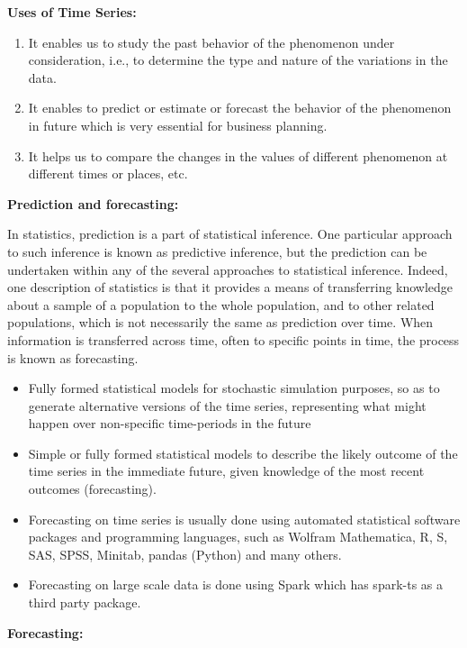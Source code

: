 \documentclass[12pt,openany]{book}
\providecommand{\tightlist}{%
  \setlength{\itemsep}{0pt}\setlength{\parskip}{0pt}}
\begin{document}
\textbf{Uses of Time Series:}

\begin{enumerate}
\def\labelenumi{\arabic{enumi}.}
\tightlist
\item
  It enables us to study the past behavior of the phenomenon under consideration, i.e., to determine the type and nature of the variations in the data.
\item
  It enables to predict or estimate or forecast the behavior of the phenomenon in future which is very essential for business planning.
\item
  It helps us to compare the changes in the values of different phenomenon at different times or places, etc.
\end{enumerate}

\textbf{Prediction and forecasting:}

In statistics, prediction is a part of statistical inference. One particular approach to such inference is known as predictive inference, but the prediction can be undertaken within any of the several approaches to statistical inference. Indeed, one description of statistics is that it provides a means of transferring knowledge about a sample of a population to the whole population, and to other related populations, which is not necessarily the same as prediction over time. When information is transferred across time, often to specific points in time, the process is known as forecasting.

\begin{itemize}
\tightlist
\item
  Fully formed statistical models for stochastic simulation purposes, so as to generate alternative versions of the time series, representing what might happen over non-specific time-periods in the future
\item
  Simple or fully formed statistical models to describe the likely outcome of the time series in the immediate future, given knowledge of the most recent outcomes (forecasting).
\item
  Forecasting on time series is usually done using automated statistical software packages and programming languages, such as Wolfram Mathematica, R, S, SAS, SPSS, Minitab, pandas (Python) and many others.
\item
  Forecasting on large scale data is done using Spark which has spark-ts as a third party package.
\end{itemize}

\textbf{Forecasting:}
\end{document}
